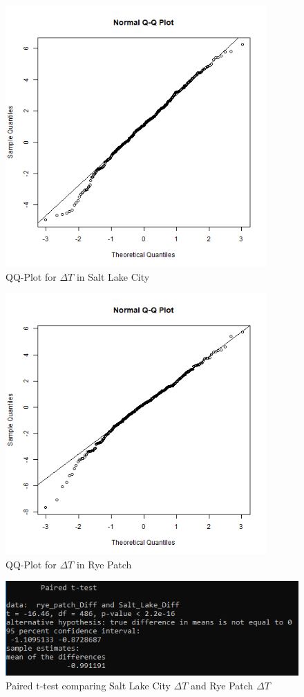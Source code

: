 \documentclass[final]{siamart1116}
\begin{document}
\begin{figure}
  \centering
  \includegraphics[width=10cm]{../data/img/Salt_Lake_Diff_QQ_Plot.PNG}
  \caption{QQ-Plot for $\Delta T$ in Salt Lake City}
  \label{fig:slc_diff_qqplot}
\end{figure}

\begin{figure}
  \centering
  \includegraphics[width=10cm]{../data/img/Rye_Patch_Diff_QQ_Plot.PNG}
  \caption{QQ-Plot for $\Delta T$ in Rye Patch}
  \label{fig:rp_diff_qqplot}
\end{figure}

\begin{figure}
  \centering
  \includegraphics[width=15cm]{../data/img/diff_paired_test.PNG}
  \caption{Paired t-test comparing Salt Lake City $\Delta T$ and Rye Patch $\Delta T$}
  \label{fig:t_test_diffs}
\end{figure}
\end{document}
